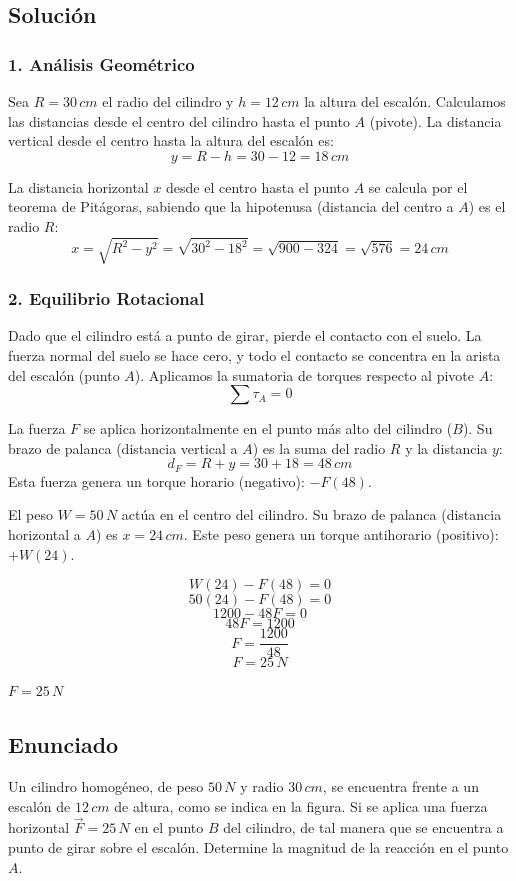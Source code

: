 \documentclass[12pt, a4paper]{article}
\begin{document}
\subsection*{Solución}

\subsubsection*{1. Análisis Geométrico}
Sea $R = 30 \, \si{cm}$ el radio del cilindro y $h = 12 \, \si{cm}$ la altura del escalón.
Calculamos las distancias desde el centro del cilindro hasta el punto $A$ (pivote).
La distancia vertical desde el centro hasta la altura del escalón es:
$$y = R - h = 30 - 12 = 18 \, \si{cm}$$

La distancia horizontal $x$ desde el centro hasta el punto $A$ se calcula por el teorema de Pitágoras, sabiendo que la hipotenusa (distancia del centro a $A$) es el radio $R$:
$$x = \sqrt{R^2 - y^2} = \sqrt{30^2 - 18^2} = \sqrt{900 - 324} = \sqrt{576} = 24 \, \si{cm}$$

\subsubsection*{2. Equilibrio Rotacional}
Dado que el cilindro está a punto de girar, pierde el contacto con el suelo. La fuerza normal del suelo se hace cero, y todo el contacto se concentra en la arista del escalón (punto $A$).
Aplicamos la sumatoria de torques respecto al pivote $A$:
$$\sum \tau_A = 0$$

La fuerza $F$ se aplica horizontalmente en el punto más alto del cilindro ($B$). Su brazo de palanca (distancia vertical a $A$) es la suma del radio $R$ y la distancia $y$:
$$d_F = R + y = 30 + 18 = 48 \, \si{cm}$$
Esta fuerza genera un torque horario (negativo): $-F(48)$.

El peso $W = 50 \, \si{N}$ actúa en el centro del cilindro. Su brazo de palanca (distancia horizontal a $A$) es $x = 24 \, \si{cm}$.
Este peso genera un torque antihorario (positivo): $+W(24)$.

$$W(24) - F(48) = 0$$
$$50(24) - F(48) = 0$$
$$1200 - 48F = 0$$
$$48F = 1200$$
$$F = \frac{1200}{48}$$
$$F = 25 \, \si{N}$$

\begin{tcolorbox}[colback=green!5!white, colframe=green!50!black, title=Respuesta Final]
\centering \Large $F = 25 \, \si{N}$
\end{tcolorbox}

\newpage

\subsection*{Enunciado}
Un cilindro homogéneo, de peso $50 \, \si{N}$ y radio $30 \, \si{cm}$, se encuentra frente a un escalón de $12 \, \si{cm}$ de altura, como se indica en la figura. Si se aplica una fuerza horizontal $\vec{F} = 25 \, \si{N}$ en el punto $B$ del cilindro, de tal manera que se encuentra a punto de girar sobre el escalón. Determine la magnitud de la reacción en el punto $A$.
\end{document}
